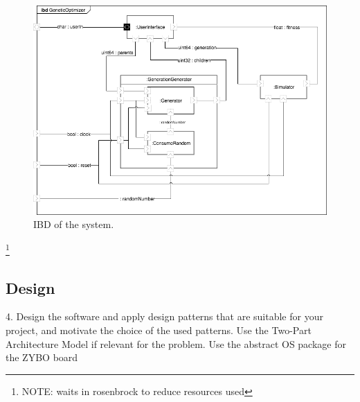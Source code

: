 \begin{figure}[htbp]
\begin{centering}
\includegraphics[width=\linewidth]{../diagrams/ibd.png}
\caption{IBD of the system.}
\label{fig:ibd}
\end{centering}
\end{figure}



\footnote{\color{red}NOTE: waits in rosenbrock to reduce resources used}


\subsection{Design}

\begin{framed}
4. Design the software and apply design patterns that are suitable for your project, and motivate the choice of the used patterns. Use the Two-Part Architecture Model if relevant for the problem. Use the abstract OS package for the ZYBO board
\end{framed}